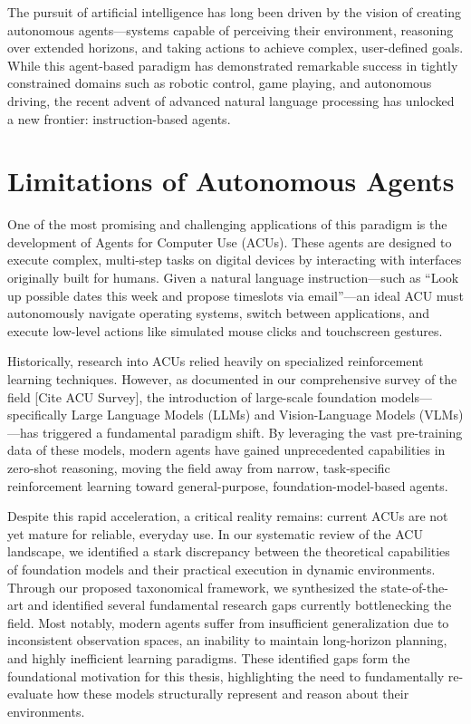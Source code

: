 The pursuit of artificial intelligence has long been driven by the vision of creating autonomous agents---systems capable of perceiving their environment, reasoning over extended horizons, and taking actions to achieve complex, user-defined goals. While this agent-based paradigm has demonstrated remarkable success in tightly constrained domains such as robotic control, game playing, and autonomous driving, the recent advent of advanced natural language processing has unlocked a new frontier: instruction-based agents. 

\section{Limitations of Autonomous Agents}

One of the most promising and challenging applications of this paradigm is the development of Agents for Computer Use (ACUs). These agents are designed to execute complex, multi-step tasks on digital devices by interacting with interfaces originally built for humans. Given a natural language instruction---such as ``Look up possible dates this week and propose timeslots via email''---an ideal ACU must autonomously navigate operating systems, switch between applications, and execute low-level actions like simulated mouse clicks and touchscreen gestures. 

Historically, research into ACUs relied heavily on specialized reinforcement learning techniques. However, as documented in our comprehensive survey of the field [Cite ACU Survey], the introduction of large-scale foundation models---specifically Large Language Models (LLMs) and Vision-Language Models (VLMs)---has triggered a fundamental paradigm shift. By leveraging the vast pre-training data of these models, modern agents have gained unprecedented capabilities in zero-shot reasoning, moving the field away from narrow, task-specific reinforcement learning toward general-purpose, foundation-model-based agents.

Despite this rapid acceleration, a critical reality remains: current ACUs are not yet mature for reliable, everyday use. In our systematic review of the ACU landscape, we identified a stark discrepancy between the theoretical capabilities of foundation models and their practical execution in dynamic environments. Through our proposed taxonomical framework, we synthesized the state-of-the-art and identified several fundamental research gaps currently bottlenecking the field. Most notably, modern agents suffer from insufficient generalization due to inconsistent observation spaces, an inability to maintain long-horizon planning, and highly inefficient learning paradigms. These identified gaps form the foundational motivation for this thesis, highlighting the need to fundamentally re-evaluate how these models structurally represent and reason about their environments.

